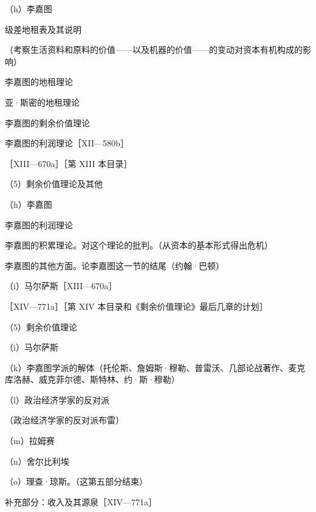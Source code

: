 \indentpara{4em}（h）李嘉图

\indentpara{6em}级差地租表及其说明

\indentpara{6em}（考察生活资料和原料的价值——以及机器的价值——的变动对资本有机构成的影响）

\indentpara{6em}李嘉图的地租理论

\indentpara{6em}亚·斯密的地租理论

\indentpara{6em}李嘉图的剩余价值理论

\indentpara{6em}李嘉图的利润理论［XII—580b］

\indentpara{0em}［XIII—670a］［第 XIII 本目录］

\indentpara{2em}（5）剩余价值理论及其他

\indentpara{4em}（h）李嘉图

\indentpara{6em}李嘉图的利润理论

\indentpara{6em}李嘉图的积累理论。对这个理论的批判。（从资本的基本形式得出危机）

\indentpara{6em}李嘉图的其他方面。论李嘉图这一节的结尾（约翰·巴顿）

\indentpara{4em}（i）马尔萨斯［XIII—670a］

\indentpara{0em}［XIV—771a］［第 XIV 本目录和《剩余价值理论》最后几章的计划］

\indentpara{2em}（5）剩余价值理论

\indentpara{4em}（i）马尔萨斯

\indentpara{4em}（k）李嘉图学派的解体（托伦斯、詹姆斯·穆勒、普雷沃、几部论战著作、麦克库洛赫、威克菲尔德、斯特林、约·斯·穆勒）

\indentpara{4em}（l）政治经济学家的反对派

\indentpara{6em}（政治经济学家的反对派布雷）

\indentpara{4em}（m）拉姆赛

\indentpara{4em}（n）舍尔比利埃

\indentpara{4em}（o）理查·琼斯。（这第五部分结束）

\indentpara{6em}补充部分：收入及其源泉［XIV—771a］

